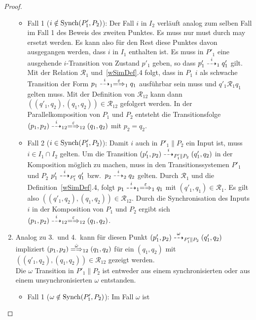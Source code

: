 \begin{proof}
\begin{enumerate}
      \begin{itemize}
        \item Fall 1 ($i\notin\mathrm{Synch} (P'_1,P_2)$): Der Fall $i$ in $I_2$
          verläuft analog zum selben Fall im Fall 1 des Beweis des zweiten
          Punktes. Es muss nur must durch may ersetzt werden. Es kann also für
          den Rest diese Punktes davon ausgegangen werden, dass $i$ in $I_1$
          enthalten ist. Es muss in $P'_1$ eine ausgehende $i$-Transition von
          Zustand $p'_1$ geben, so dass $p'_1\may[i]_1 q'_1$ gilt. Mit der
          Relation $\mathcal{R}_1$ und~\ref{wSimDef}.4 folgt, dass in $P_1$
          $i$ als schwache Transition der Form $p_1\may[i]_1
          \weakmay[\varepsilon]_1 q_1$ ausführbar sein muss und $q'_1
          \mathcal{R}_1 q_1$ gelten muss. Mit der Definition von
          $\mathcal{R}_{12}$ kann dann $((q'_1,q_2),(q_1,q_2)) \in
          \mathcal{R}_{12}$ gefolgert werden. In der Parallelkomposition von
          $P_1$ und $P_2$ entsteht die Transitionsfolge $(p_1,p_2)\may[i]_{12}
          \weakmay[\varepsilon]_{12} (q_1,q_2)$ mit $p_2=q_2$.
        \item Fall 2 ($i\in\mathrm{Synch} (P'_1,P_2)$): Damit $i$ auch in
          $P'_1\|P_2$ ein Input ist, muss $i\in I_1\cap I_2$ gelten. Um die
          Transition $(p'_1,p_2)\may[i]_{P'_1\|P_2}(q'_1,q_2)$ in der
          Komposition möglich zu machen, muss in den Transitionssystemen
          $P'_1$ und $P_2$ $p'_1 \may[i]_{P'_1} q'_1$ bzw.\ $p_2\may[i]_2 q_2$
          gelten. Durch $\mathcal{R}_1$ und die Definition~\ref{wSimDef}.4,
          folgt $p_1\may[i]_1 \weakmay[\varepsilon]_1 q_1$ mit $(q'_1,q_1) \in
          \mathcal{R}_1$. Es gilt also $((q'_1,q_2),(q_1,q_2)) \in
          \mathcal{R}_{12}$. Durch die Synchronisation des Inputs $i$ in der
          Komposition von $P_1$ und $P_2$ ergibt sich $(p_1,p_2) \may[i]_{12}
          \weakmay[\varepsilon]_{12} (q_1,q_2)$.
      \end{itemize}
    \item Analog zu 3.\ und 4.\ kann für diesen Punkt $(p'_1,p_2)
      \may[\omega]_{P'_1\|P_2} (q'_1,q_2)$ impliziert $(p_1,p_2)
      \weakmay[\hat{\omega}]_{12} (q_1,q_2)$ für ein $(q_1,q_2)$ mit
      $((q'_1,q_2),(q_1,q_2))\in\mathcal{R}_{12}$ gezeigt werden.\\
      Die $\omega$ Transition in $P'_1\|P_2$ ist entweder aus einem
      synchronisierten oder aus einem unsynchronisierten $\omega$ entstanden.
      \begin{itemize}
        \item Fall 1 ($\omega\notin\mathrm{Synch} (P'_1,P_2)$): Im Fall $\omega$ ist

\end{itemize}
\end{enumerate}
\end{proof}
